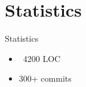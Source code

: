 \section{Statistics}

\begin{frame}{Statistics}
\begin{itemize}
	\item ~4200 LOC
	\item 300+ commits
\end{itemize}
\end{frame}
